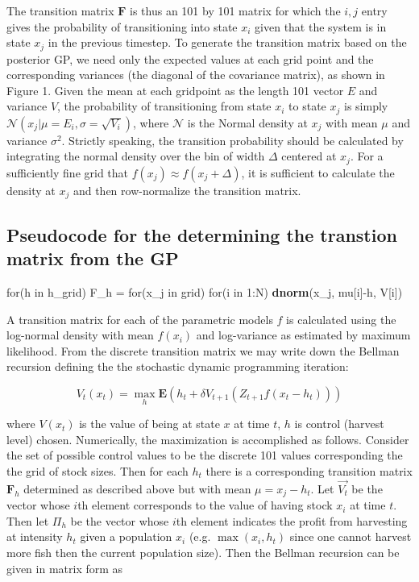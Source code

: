 \documentclass[author-year, review]{elsarticle} %
\newenvironment{Shaded}{}{}
\newcommand{\KeywordTok}[1]{\textcolor[rgb]{0.00,0.44,0.13}{\textbf{{#1}}}}
\newcommand{\DecValTok}[1]{\textcolor[rgb]{0.25,0.63,0.44}{{#1}}}
\newcommand{\StringTok}[1]{\textcolor[rgb]{0.25,0.44,0.63}{{#1}}}
\newcommand{\NormalTok}[1]{{#1}}
\begin{document}
The transition matrix $\mathbf{F}$ is thus an 101 by 101 matrix for
which the ${i,j}$ entry gives the probability of transitioning into
state $x_i$ given that the system is in state $x_j$ in the previous
timestep. To generate the transition matrix based on the posterior GP,
we need only the expected values at each grid point and the
corresponding variances (the diagonal of the covariance matrix), as
shown in Figure 1. Given the mean at each gridpoint as the length 101
vector $E$ and variance $V$, the probability of transitioning from state
$x_i$ to state $x_j$ is simply
$\mathcal{N}\left(x_j \vert  \mu = E_i, \sigma = \sqrt{V_i}\right)$,
where $\mathcal{N}$ is the Normal density at $x_j$ with mean $\mu$ and
variance $\sigma^2$. Strictly speaking, the transition probability
should be calculated by integrating the normal density over the bin of
width $\Delta$ centered at $x_j$. For a sufficiently fine grid that
$f(x_j) \approx f(x_j + \Delta)$, it is sufficient to calculate the
density at $x_j$ and then row-normalize the transition matrix.

\subsection{Pseudocode for the determining the transtion matrix from the
GP}

\begin{Shaded}
\begin{Highlighting}[]
\NormalTok{for(h in h_grid)}
  \NormalTok{F_h =}\StringTok{ }\NormalTok{for(x_j in grid)}
          \NormalTok{for(i in }\DecValTok{1}\NormalTok{:N) }
            \KeywordTok{dnorm}\NormalTok{(x_j, mu[i]-h, V[i])}
\end{Highlighting}
\end{Shaded}

A transition matrix for each of the parametric models $f$ is calculated
using the log-normal density with mean $f(x_i)$ and log-variance as
estimated by maximum likelihood. From the discrete transition matrix we
may write down the Bellman recursion defining the the stochastic dynamic
programming iteration:

\begin{equation}
V_t(x_t) = \max_h \mathbf{E} \left( h_t + \delta V_{t+1}( Z_{t+1} f(x_t - h_t)) \right)
\end{equation}

where $V(x_t)$ is the value of being at state $x$ at time $t$, $h$ is
control (harvest level) chosen. Numerically, the maximization is
accomplished as follows. Consider the set of possible control values to
be the discrete 101 values corresponding the the grid of stock sizes.
Then for each $h_t$ there is a corresponding transition matrix
$\mathbf{F}_h$ determined as described above but with mean
$\mu = x_j - h_t$. Let $\vec{V_t}$ be the vector whose $i$th element
corresponds to the value of having stock $x_i$ at time $t$. Then let
$\Pi_h$ be the vector whose $i$th element indicates the profit from
harvesting at intensity $h_t$ given a population $x_i$ (e.g.
$\max(x_i, h_t)$ since one cannot harvest more fish then the current
population size). Then the Bellman recursion can be given in matrix form
as
\end{document}
